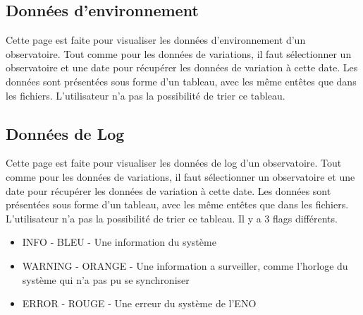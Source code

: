 \documentclass[10pt,a4paper]{report}
\begin{document}
\subsection{Données d'environnement}
\label{sec:env}
Cette page est faite pour visualiser les données d'environnement d'un observatoire.
\linebreak
Tout comme pour les données de variations, il faut sélectionner un observatoire et une date pour récupérer les données de variation à cette date. Les données sont présentées sous forme d'un tableau, avec les même entêtes que dans les fichiers. L'utilisateur n'a pas la possibilité de trier ce tableau.

\subsection{Données de Log}
\label{sec:log}
Cette page est faite pour visualiser les données de log d'un observatoire.
\linebreak
Tout comme pour les données de variations, il faut sélectionner un observatoire et une date pour récupérer les données de variation à cette date. Les données sont présentées sous forme d'un tableau, avec les même entêtes que dans les fichiers. L'utilisateur n'a pas la possibilité de trier ce tableau. Il y a 3 flags différents.
\begin{itemize}
\item INFO - BLEU - Une information du système
\item WARNING - ORANGE - Une information a surveiller, comme l'horloge du système qui n'a pas pu se synchroniser
\item ERROR - ROUGE - Une erreur du système de l'ENO
\end{itemize}
\end{document}
